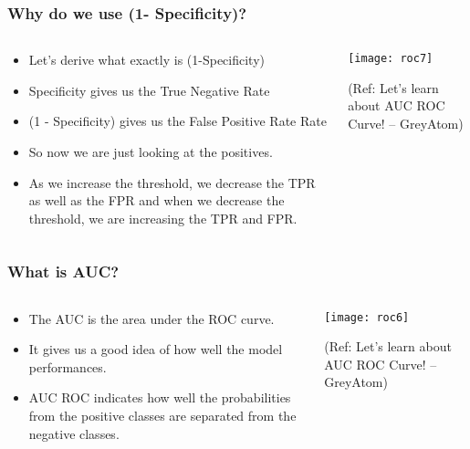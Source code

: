 \begin{frame}[fragile]\frametitle{Why do we use (1- Specificity)?}

\begin{columns}
\begin{column}[T]{0.5\linewidth}
\begin{itemize}
\item Let’s derive what exactly is (1-Specificity)
\item  Specificity gives us the True Negative Rate
\item  (1 - Specificity) gives us the  False Positive Rate Rate
\item So now we are just looking at the positives. 
\item As we increase the threshold,
we decrease the TPR as well as the FPR and when we decrease the
threshold, we are increasing the TPR and FPR.
\end{itemize}
\end{column}
\begin{column}[T]{0.5\linewidth}

\begin{center}
\texttt{[image: roc7]}
\end{center}

\tiny{(Ref: Let's learn about AUC ROC Curve! – GreyAtom)}
\end{column}

\end{columns}
\end{frame}


\begin{frame}[fragile]\frametitle{What is AUC?}

\begin{columns}
\begin{column}[T]{0.5\linewidth}
\begin{itemize}
\item The AUC is the area under the ROC curve. 
\item It gives us a good idea
of how well the model performances.
\item AUC ROC indicates how well the probabilities from the positive
classes are separated from the negative classes.
\end{itemize}
\end{column}
\begin{column}[T]{0.5\linewidth}

\begin{center}
\texttt{[image: roc6]}
\end{center}

\tiny{(Ref: Let's learn about AUC ROC Curve! – GreyAtom)}
\end{column}

\end{columns}
\end{frame}




